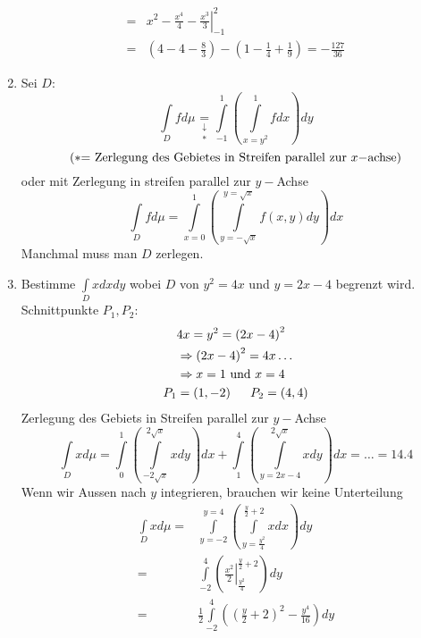 \begin{enumerate}
\begin{align*}
 =&\left. {{x^2} - \frac{{{x^4}}}{4} - \frac{{{x^3}}}{3}} \right|_{ - 1}^2\\
 =&\left( {4 - 4 - \frac{8}{3}} \right) - \left( {1 - \frac{1}{4} + \frac{1}{9}} \right) =  - \frac{{127}}{{36}}
\end{align*}
\item Sei $D:$
\[\int\limits_D {fd\mu } \mathop  = \limits_{\begin{array}{*{20}{c}}
 \downarrow \\
 * 
\end{array}} \int\limits_{ - 1}^1 {\left( {\int\limits_{x = {y^2}}^1 {fdx} } \right)} dy\]
$$\text{(\textasteriskcentered $=$ Zerlegung des Gebietes in Streifen parallel zur $x-$achse)}$$
oder mit Zerlegung in streifen parallel zur $y-$Achse
\[\int\limits_D {fd\mu }  = \int\limits_{x = 0}^1 {\left( {\int\limits_{y =  - \sqrt x }^{y = \sqrt x } {f\left( {x,y} \right)dy} } \right)} dx\]
Manchmal muss man $D$ zerlegen.
\item Bestimme $\int\limits_D {xdxdy} $ wobei $D$ von $y^2=4x$ und $y=2x-4$ begrenzt wird.
Schnittpunkte $P_1,P_2$:
\begin{align*}
&4x=y^2=\left( 2x-4\right)^2\\
&\Rightarrow\left( 2x-4\right)^2=4x\dots\\
&\Rightarrow x=1 \text{ und } x=4\\
P_1&=\left(1,-2\right)\hspace{5mm}P_2=\left(4,4\right)
\end{align*}
Zerlegung des Gebiets in Streifen parallel zur $y-$Achse
\[\int\limits_D {xd\mu  = \int\limits_0^1 {\left( {\int\limits_{ - 2\sqrt x }^{2\sqrt x } {xdy} } \right)dx} }  + \int\limits_1^4 {\left( {\int\limits_{y = 2x - 4}^{2\sqrt x } {xdy} } \right)} dx =  \ldots  = 14.4\]
Wenn wir Aussen nach $y$ integrieren, brauchen wir keine Unterteilung
\begin{align*}
\int\limits_D xd\mu  =&\int\limits_{y =  - 2}^{y = 4} {\left( {\int\limits_{y = \frac{{{y^2}}}{4}}^{\frac{y}{2} + 2} {xdx} }\right)dy} \\
 =&\int\limits_{ - 2}^4 {\left( {\left. {\frac{{{x^2}}}{2}} \right|_{\frac{{{y^2}}}{4}}^{\frac{y}{2} + 2}} \right)dy}\\
=&\frac{1}{2}\int\limits_{ - 2}^4 {\left( {{{\left( {\frac{y}{2} + 2} \right)}^2} - \frac{{{y^4}}}{{16}}} \right)dy}
\end{align*}
\end{enumerate}

